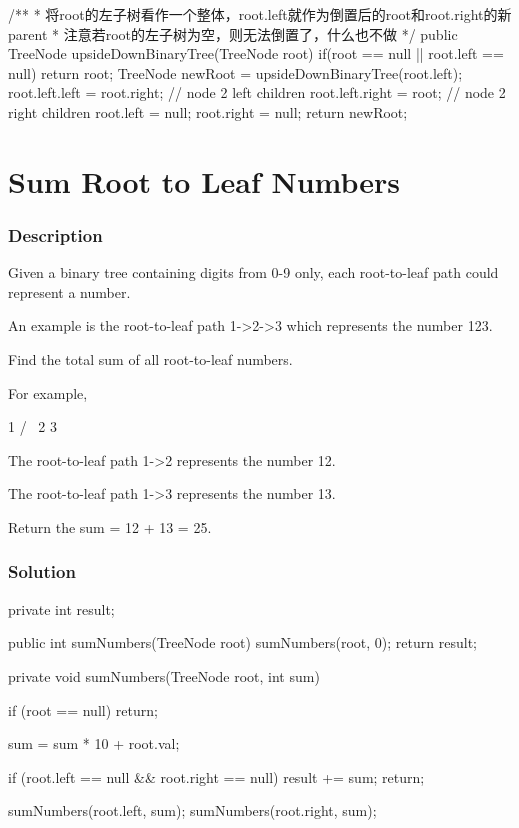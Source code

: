 \begin{Code}
/**
 * 将root的左子树看作一个整体，root.left就作为倒置后的root和root.right的新parent
 * 注意若root的左子树为空，则无法倒置了，什么也不做
 */
public TreeNode upsideDownBinaryTree(TreeNode root) {
    if(root == null || root.left == null) {
        return root;
    }
    TreeNode newRoot = upsideDownBinaryTree(root.left);
    root.left.left = root.right;   // node 2 left children
    root.left.right = root;         // node 2 right children
    root.left = null;
    root.right = null;
    return newRoot;
}
\end{Code}

\newpage

\section{Sum Root to Leaf Numbers} %

\subsubsection{Description}
Given a binary tree containing digits from 0-9 only, each root-to-leaf path could represent a number.

An example is the root-to-leaf path 1->2->3 which represents the number 123.

Find the total sum of all root-to-leaf numbers.

For example,
\begin{Code}
    1
   / \
  2   3
\end{Code}
The root-to-leaf path 1->2 represents the number 12.

The root-to-leaf path 1->3 represents the number 13.

Return the sum = 12 + 13 = 25.
\subsubsection{Solution}

\begin{Code}
private int result;

public int sumNumbers(TreeNode root) {
    sumNumbers(root, 0);
    return result;
}

private void sumNumbers(TreeNode root, int sum) {
    if (root == null) {
        return;
    }

    sum = sum * 10 + root.val;

    if (root.left == null && root.right == null) {
        result += sum;
        return;
    }

    sumNumbers(root.left, sum);
    sumNumbers(root.right, sum);
}
\end{Code}

